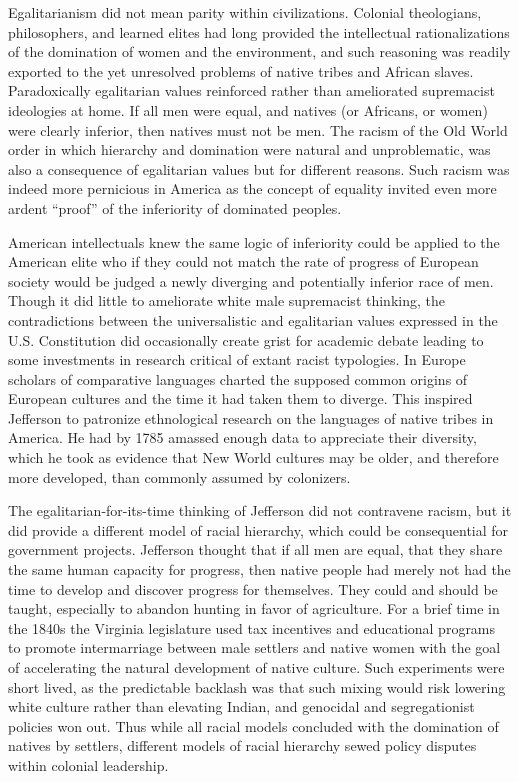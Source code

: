 \documentclass[]{book}
\begin{document}
Egalitarianism did not mean parity within civilizations. Colonial
theologians, philosophers, and learned elites had long provided the
intellectual rationalizations of the domination of women and the
environment, and such reasoning was readily exported to the yet
unresolved problems of native tribes and African slaves. Paradoxically
egalitarian values reinforced rather than ameliorated supremacist
ideologies at home. If all men were equal, and natives (or Africans, or
women) were clearly inferior, then natives must not be men. The racism
of the Old World order in which hierarchy and domination were natural
and unproblematic, was also a consequence of egalitarian values but for
different reasons. Such racism was indeed more pernicious in America as
the concept of equality invited even more ardent ``proof'' of the
inferiority of dominated peoples.

American intellectuals knew the same logic of inferiority could be
applied to the American elite who if they could not match the rate of
progress of European society would be judged a newly diverging and
potentially inferior race of men. Though it did little to ameliorate
white male supremacist thinking, the contradictions between the
universalistic and egalitarian values expressed in the U.S. Constitution
did occasionally create grist for academic debate leading to some
investments in research critical of extant racist typologies. In Europe
scholars of comparative languages charted the supposed common origins of
European cultures and the time it had taken them to diverge. This
inspired Jefferson to patronize ethnological research on the languages
of native tribes in America. He had by 1785 amassed enough data to
appreciate their diversity, which he took as evidence that New World
cultures may be older, and therefore more developed, than commonly
assumed by colonizers.

The egalitarian-for-its-time thinking of Jefferson did not contravene
racism, but it did provide a different model of racial hierarchy, which
could be consequential for government projects. Jefferson thought that
if all men are equal, that they share the same human capacity for
progress, then native people had merely not had the time to develop and
discover progress for themselves. They could and should be taught,
especially to abandon hunting in favor of agriculture. For a brief time
in the 1840s the Virginia legislature used tax incentives and
educational programs to promote intermarriage between male settlers and
native women with the goal of accelerating the natural development of
native culture. \citep[9]{Patterson2001Social} Such experiments were
short lived, as the predictable backlash was that such mixing would risk
lowering white culture rather than elevating Indian, and genocidal and
segregationist policies won out. Thus while all racial models concluded
with the domination of natives by settlers, different models of racial
hierarchy sewed policy disputes within colonial leadership.
\end{document}
